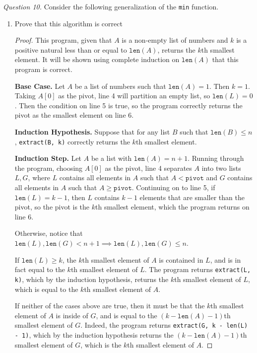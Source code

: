 \documentclass[11pt]{article}
\begin{document}
    \textit{Question 10.} Consider the following generalization of the \verb|min| function.
    \begin{enumerate}[label=(\alph*)]
        \item Prove that this algorithm is correct
        
        \begin{proof}
            This program, given that \(A\) is a non-empty list of numbers and \(k\) is a positive natural less than or equal to \(\texttt{len}(A)\), returns the \(k\)th smallest element. It will be shown using complete induction on \(\texttt{len}(A)\) that this program is correct.

            \textbf{Base Case.} Let \(A\) be a list of numbers such that \(\texttt{len}(A) = 1\). Then \(k=1\). Taking \(A[0]\) as the pivot, line 4 will partition an empty list, so \(\texttt{len}(L) = 0\). Then the condition on line 5 is true, so the program correctly returns the pivot as the smallest element on line 6.

            \textbf{Induction Hypothesis.} Suppose that for any list \(B\) such that \(\texttt{len}(B) \leq n\), \verb|extract(B, k)| correctly returns the \(k\)th smallest element.

            \textbf{Induction Step.} Let \(A\) be a list with \(\texttt{len}(A) = n + 1\). Running through the program, choosing \(A[0]\) as the pivot, line 4 separates \(A\) into two lists \(L,G\), where \(L\) contains all elements in \(A\) such that \(A < \texttt{pivot}\) and \(G\) contains all elements in \(A\) such that \(A \geq \texttt{pivot}\). Continuing on to line 5, if \(\texttt{len}(L) = k - 1\), then \(L\) contains \(k-1\) elements that are smaller than the pivot, so the pivot is the \(k\)th smallest element, which the program returns on line 6.

            Otherwise, notice that \(\texttt{len}(L),\texttt{len}(G) < n+1 \implies \texttt{len}(L),\texttt{len}(G) \leq n\).
            
            If \(\texttt{len}(L) \geq k\), the \(k\)th smallest element of \(A\) is contained in \(L\), and is in fact equal to the \(k\)th smallest element of \(L\). The program returns \verb|extract(L, k)|, which by the induction hypothesis, returns the \(k\)th smallest element of \(L\), which is equal to the \(k\)th smallest element of \(A\).

            If neither of the cases above are true, then it must be that the \(k\)th smallest element of \(A\) is inside of \(G\), and is equal to the \((k - \texttt{len}(A) - 1)\)th smallest element of \(G\). Indeed, the program returns \verb|extract(G, k - len(L) - 1)|, which by the induction hypothesis returns the \((k - \texttt{len}(A) - 1)\)th smallest element of \(G\), which is the \(k\)th smallest element of \(A\).


\end{proof}
\end{enumerate}
\end{document}
